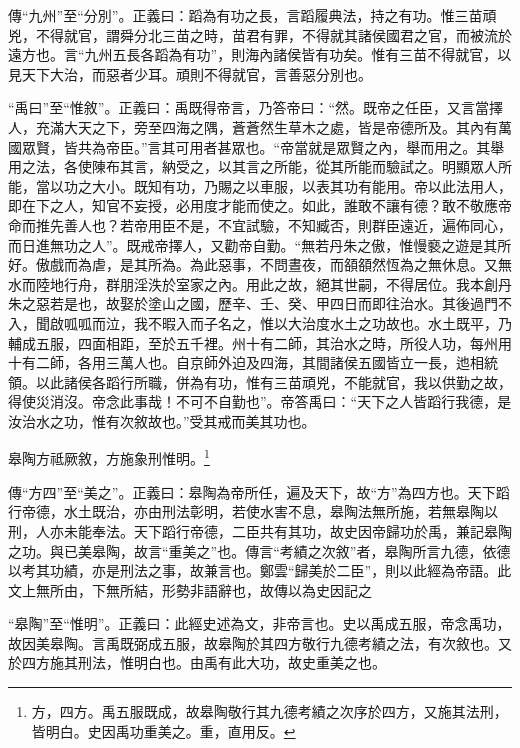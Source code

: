 {\noindent\zhuan{}\fzbyks 傳“九州”至“分別”。正義曰：蹈為有功之長，言蹈履典法，持之有功。惟三苗頑兇，不得就官，謂舜分北三苗之時，苗君有罪，不得就其諸侯國君之官，而被流於遠方也。言“九州五長各蹈為有功”，則海內諸侯皆有功矣。惟有三苗不得就官，以見天下大治，而惡者少耳。頑則不得就官，言善惡分別也。 \par}

{\noindent\shu{}\fzkt “禹曰”至“惟敘”。正義曰：禹既得帝言，乃答帝曰：“然。既帝之任臣，又言當擇人，充滿大天之下，旁至四海之隅，蒼蒼然生草木之處，皆是帝德所及。其內有萬國眾賢，皆共為帝臣。”言其可用者甚眾也。“帝當就是眾賢之內，舉而用之。其舉用之法，各使陳布其言，納受之，以其言之所能，從其所能而驗試之。明顯眾人所能，當以功之大小。既知有功，乃賜之以車服，以表其功有能用。帝以此法用人，即在下之人，知官不妄授，必用度才能而使之。如此，誰敢不讓有德？敢不敬應帝命而推先善人也？若帝用臣不是，不宜試驗，不知臧否，則群臣遠近，遍佈同心，而日進無功之人”。既戒帝擇人，又勸帝自勤。“無若丹朱之傲，惟慢褻之遊是其所好。傲戲而為虐，是其所為。為此惡事，不問晝夜，而頟頟然恆為之無休息。又無水而陸地行舟，群朋淫泆於室家之內。用此之故，絕其世嗣，不得居位。我本創丹朱之惡若是也，故娶於塗山之國，歷辛、壬、癸、甲四日而即往治水。其後過門不入，聞啟呱呱而泣，我不暇入而子名之，惟以大治度水土之功故也。水土既平，乃輔成五服，四面相距，至於五千裡。州十有二師，其治水之時，所役人功，每州用十有二師，各用三萬人也。自京師外迫及四海，其間諸侯五國皆立一長，迆相統領。以此諸侯各蹈行所職，併為有功，惟有三苗頑兇，不能就官，我以供勤之故，得使災消沒。帝念此事哉！不可不自勤也”。帝答禹曰：“天下之人皆蹈行我德，是汝治水之功，惟有次敘故也。”受其戒而美其功也。 \par}

皋陶方祗厥敘，方施象刑惟明。\footnote{方，四方。禹五服既成，故皋陶敬行其九德考績之次序於四方，又施其法刑，皆明白。史因禹功重美之。重，直用反。}

{\noindent\zhuan{}\fzbyks 傳“方四”至“美之”。正義曰：皋陶為帝所任，遍及天下，故“方”為四方也。天下蹈行帝德，水土既治，亦由刑法彰明，若使水害不息，皋陶法無所施，若無皋陶以刑，人亦未能奉法。天下蹈行帝德，二臣共有其功，故史因帝歸功於禹，兼記皋陶之功。與已美皋陶，故言“重美之”也。傳言“考績之次敘”者，皋陶所言九德，依德以考其功績，亦是刑法之事，故兼言也。鄭雲“歸美於二臣”，則以此經為帝語。此文上無所由，下無所結，形勢非語辭也，故傳以為史因記之 \par}

{\noindent\shu{}\fzkt “皋陶”至“惟明”。正義曰：此經史述為文，非帝言也。史以禹成五服，帝念禹功，故因美皋陶。言禹既弼成五服，故皋陶於其四方敬行九德考績之法，有次敘也。又於四方施其刑法，惟明白也。由禹有此大功，故史重美之也。 \par}


